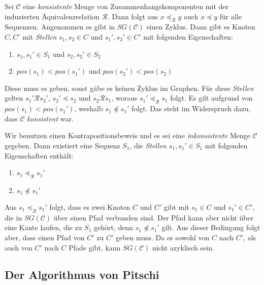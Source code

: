 \begin{beweis}
	\bewhin \hspace{2pt} Sei $\mathcal{C}$ eine \emph{konsistente} Menge von Zusammenhangskomponenten mit der induzierten Äquivalenzrelation $\mathcal{R}$. Dann folgt aus $x \preceq_{\mathcal{R}} y$ auch $x \preceq y$ für alle Sequenzen. Angenommen es gibt in $SG(\mathcal{C})$ einen Zyklus. Dann gibt es Knoten $C, C'$ mit \emph{Stellen} $s_1, s_2 \in C$ und $s_1',s_2' \in C'$ mit folgenden Eigenschaften:
	\begin{enumerate}[topsep=0pt,itemsep=-1ex,partopsep=1ex,parsep=1ex]
		\item $s_1, s_1' \in S_1$ und $s_2,s_2' \in S_2$ 
		\item $pos(s_1) < pos(s_1')$ und $pos(s_2') < pos(s_2)$
	\end{enumerate}
	Diese muss es geben, sonst gäbe es keinen Zyklus im Graphen. Für diese \emph{Stellen} gelten $s_1' \mathcal{R} s_2'$, $s_2' \preceq s_2$ und $s_2 \mathcal{R} s_1$, woraus $s_1' \preceq_{\mathcal{R}} s_1$ folgt. Es gilt aufgrund von $pos(s_1) < pos(s_1')$, weshalb $s_1 \npreceq s_1'$ folgt. Das steht im Widerspruch dazu, dass $\mathcal{C}$ \emph{konsistent} war.
	
	\bewrueck \hspace{2pt} Wir benutzen einen Kontrapositionsbeweis und es sei eine \emph{inkonsistente} Menge $\mathcal{C}$ gegeben. Dann existiert eine Sequenz $S_1$, die \emph{Stellen} $s_1,s_1' \in S_1$ mit folgenden Eigenschaften enthält:
	\begin{enumerate}[topsep=0pt,itemsep=-1ex,partopsep=1ex,parsep=1ex]
		\item $s_1 \preceq_{\mathcal{R}} s_1'$
		\item $s_1 \npreceq s_1'$
	\end{enumerate}
	Aus $s_1 \preceq_{\mathcal{R}} s_1'$ folgt, dass es zwei Knoten $C$ und $C'$ gibt mit $s_1 \in C$ und $s_1' \in C'$, die in $SG(\mathcal{C})$ über einen Pfad verbunden sind. Der Pfad kann aber nicht über eine Kante laufen, die zu $S_1$ gehört, denn $s_1 \npreceq s_1'$ gilt. Aus dieser Bedingung folgt aber, dass einen Pfad von $C'$ zu $C'$ geben muss. Da es sowohl von $C$ nach $C'$, als auch von $C'$ nach $C$ Pfade gibt, kann $SG(\mathcal{C})$ nicht azyklisch sein.
\end{beweis}

\subsection{Der Algorithmus von Pitschi}

